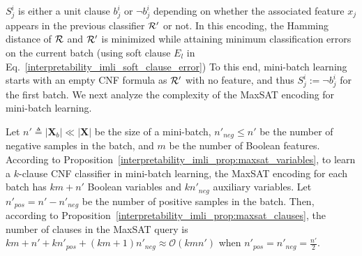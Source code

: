 $ S_j^i $ is either a unit clause $ b_j^i $ or $ \neg b_j^i $ depending on whether the associated feature $ x_j $ appears in the previous classifier $ {\mathcal{R}}' $ or not. In this encoding, the Hamming distance of $ {\mathcal{R}} $ and $ {\mathcal{R}}' $ is minimized while attaining minimum classification errors on the current batch (using soft clause $ E_l $ in Eq.~\eqref{interpretability_imli_soft_clause_error}) To this end,  mini-batch learning starts with an empty CNF formula as $ {\mathcal{R}}' $ with no feature, and thus $ S_j^i := \neg b_j^i $ for the first batch. We next analyze the complexity of the MaxSAT encoding for mini-batch learning. 


\begin{proposition}
	\label{interpretability_imli_prop:maxsat_complexity_incremental}
	Let $ n' \triangleq |\mathbf{X}_b| \ll |\mathbf{X}| $ be the size of a mini-batch, $ n'_{neg} \le n' $ be the number of negative samples in the batch, and $ m $ be the number of Boolean features. According to Proposition~\ref{interpretability_imli_prop:maxsat_variables}, to learn a $ k $-clause CNF classifier in mini-batch learning, the MaxSAT encoding for each batch has $ km + n' $ Boolean variables and $ kn'_{neg} $ auxiliary variables. Let $ n'_{pos} = n' - n'_{neg} $ be the number of positive samples in the batch. Then, according to Proposition~\ref{interpretability_imli_prop:maxsat_clauses}, the number of clauses in the MaxSAT query is $ k m+n'+k n'_{pos}+(k m+1)n'_{neg} \approx \mathcal{O}(k m  n' ) $ when $ n'_{pos}= n'_{neg} =\frac{n'}{2} $.
\end{proposition}



%

